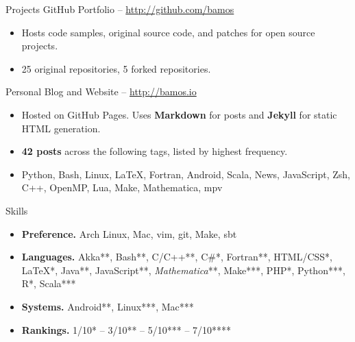 \documentclass[letter]{article}
\begin{document}
\begin{minipage}{\textwidth}
\bigskip
\end{minipage}\medskip

\begin{minipage}{\textwidth}
{\huge Projects }
{\large GitHub Portfolio -- \url{ http://github.com/bamos } }
\begin{itemize}
  \item Hosts code samples, original source code, and patches for open source projects.
  \item 25 original repositories, 5 forked repositories.
\end{itemize}
\bigskip

{\large Personal Blog and Website -- \url{ http://bamos.io } }
\begin{itemize}
  \item Hosted on GitHub Pages. Uses {\bf Markdown} for posts and {\bf Jekyll} for static HTML generation.
  \item {\bf 42 posts} across the following tags, listed by highest frequency.
  \item Python, Bash, Linux, LaTeX, Fortran, Android, Scala, News, JavaScript, Zsh, C++, OpenMP, Lua, Make, Mathematica, mpv
\end{itemize}
\bigskip
\end{minipage}\medskip

\begin{minipage}{\textwidth}
{\huge Skills }
\begin{itemize}
  \item { \bf Preference. } Arch Linux, Mac, vim, git, Make, sbt
  \item { \bf Languages. } Akka**, Bash**, C/C++**, C\#*, Fortran**, HTML/CSS*, \LaTeX**, Java**, JavaScript**, {\it Mathematica}**, Make***, PHP*, Python***, R*, Scala***
  \item { \bf Systems. } Android**, Linux***, Mac***
  \item { \bf Rankings. } 1/10* -- 3/10** -- 5/10*** -- 7/10****
\end{itemize}
\bigskip

\end{minipage}\medskip
\end{document}
